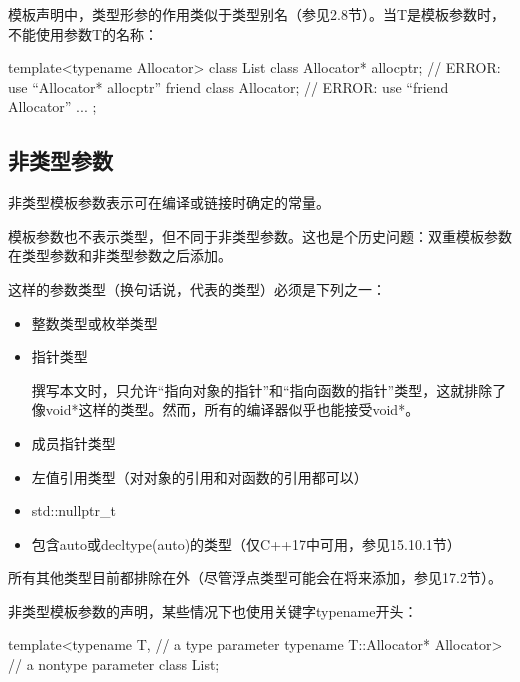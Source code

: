 模板声明中，类型形参的作用类似于类型别名（参见2.8节）。当T是模板参数时，不能使用参数T的名称：

\begin{cpp}
template<typename Allocator>
class List {
	class Allocator* allocptr; // ERROR: use “Allocator* allocptr”
	friend class Allocator; // ERROR: use “friend Allocator”
	...
};
\end{cpp}

\subsection{非类型参数}

非类型模板参数表示可在编译或链接时确定的常量。

\begin{notice}
模板参数也不表示类型，但不同于非类型参数。这也是个历史问题：双重模板参数在类型参数和非类型参数之后添加。
\end{notice}

这样的参数类型（换句话说，代表的类型）必须是下列之一：

\begin{itemize}
\item 
整数类型或枚举类型

\item 
指针类型

\begin{notice}
撰写本文时，只允许“指向对象的指针”和“指向函数的指针”类型，这就排除了像void*这样的类型。然而，所有的编译器似乎也能接受void*。
\end{notice}

\item 
成员指针类型

\item
左值引用类型（对对象的引用和对函数的引用都可以）

\item 
std::nullptr\_t

\item 
包含auto或decltype(auto)的类型（仅C++17中可用，参见15.10.1节）
\end{itemize}

所有其他类型目前都排除在外（尽管浮点类型可能会在将来添加，参见17.2节）。

非类型模板参数的声明，某些情况下也使用关键字typename开头：

\begin{cpp}
template<typename T, // a type parameter
		typename T::Allocator* Allocator> // a nontype parameter
class List;
\end{cpp}

